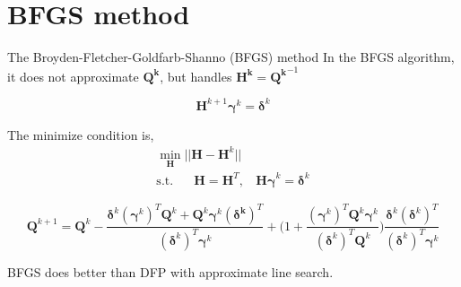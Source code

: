 \documentclass{beamer}
\begin{document}
\section{BFGS method}
\begin{frame}{The Broyden-Fletcher-Goldfarb-Shanno (BFGS) method}
In the BFGS algorithm, it does not approximate $\boldsymbol{Q^k}$, but handles $\boldsymbol{H^k} = \boldsymbol{Q^k}^{-1}$

\begin{equation*}
    \boldsymbol{H}^{k+1}\boldsymbol{\gamma}^{k} = \boldsymbol{\delta}^{k}    
\end{equation*}

The minimize condition is,
\begin{gather*}
    \underset{\boldsymbol{H}}{\min} ||\boldsymbol{H} - \boldsymbol{H}^{k}|| \\
    \textrm{s.t.~~~~~} \boldsymbol{H} = \boldsymbol{H}^T,~~~~    \boldsymbol{H \gamma}^k = \boldsymbol{\delta}^k
\end{gather*}

\begin{equation*}
    \boldsymbol{Q}^{k+1} = \boldsymbol{Q}^k - 
    \frac{\boldsymbol{\delta}^k (\boldsymbol{\gamma}^k)^T \boldsymbol{Q}^k + \boldsymbol{Q}^k\boldsymbol{\gamma}^k (\boldsymbol{\delta^k})^T}
    {(\boldsymbol{\delta}^k)^T \boldsymbol{\gamma}^k} 
    + \bigg(1 + \frac{(\boldsymbol{\gamma}^k)^T \boldsymbol{Q}^k \boldsymbol{\gamma}^k}{(\boldsymbol{\delta}^k)^T \boldsymbol{Q}^k}\bigg)
    \frac{\boldsymbol{\delta}^k (\boldsymbol{\delta}^k)^T}{(\boldsymbol{\delta}^k)^T \boldsymbol{\gamma}^k}
    
\end{equation*}



BFGS does better than DFP with approximate line search. 
\end{frame}
\end{document}
